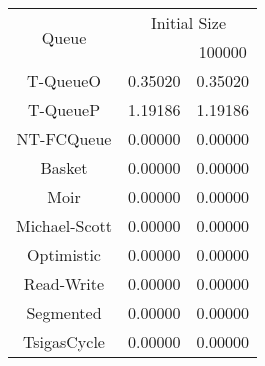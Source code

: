 \begin{tabular}{|c|c|c|}
\hline
\multirow{2}{*}{Queue} & \multicolumn{2}{c|}{Initial Size}\\\cline{2-3}& \qquad 10000 \qquad\quad & 100000\\
\hline
\hline
T-QueueO & 0.35020 & 0.35020\\
T-QueueP & 1.19186 & 1.19186\\
NT-FCQueue & 0.00000 & 0.00000\\
Basket & 0.00000 & 0.00000\\
Moir & 0.00000 & 0.00000\\
Michael-Scott & 0.00000 & 0.00000\\
Optimistic & 0.00000 & 0.00000\\
Read-Write & 0.00000 & 0.00000\\
Segmented & 0.00000 & 0.00000\\
TsigasCycle & 0.00000 & 0.00000\\
\hline\end{tabular}
